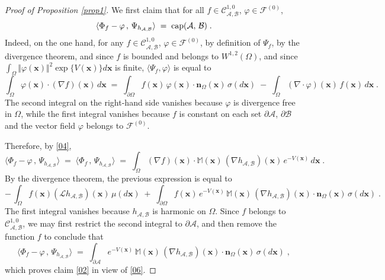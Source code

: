 \documentclass[reqno]{amsart}
\newcommand{\mc}[1]{{\mathcal #1}}
\newcommand{\bb}[1]{{\mathbb #1}}
\newcommand{\bs}[1]{{\boldsymbol #1}}
\newcommand{\<}{\langle}
\renewcommand{\>}{\rangle}
\renewcommand{\Cap}{{\rm cap}}
\begin{document}
\begin{proof}[Proof of Proposition \ref{prop1}]
We first claim that for all $f\in \mathcal C^{1,0}_{\mc A,\mc B}$, $\varphi
\in \mathcal F^{(0)}$,
\begin{equation}
\label{02}
\<\Phi_f - \varphi \,,\, \Psi_{h_{\mc A,\mc B}}\>  \;=\; \Cap (\mc A,\,\mc B) \;.
\end{equation}
Indeed, on the one hand, for any $f\in \mathcal C^{1,0}_{\mc A,\mc B}$, $\varphi
\in \mathcal F^{(0)}$, by definition of $\Psi_f$, by the divergence
theorem, and since $f$ is bounded and belongs to $ W^{1,2}(\Omega)$,
and since $\int_{\Omega} \Vert\varphi(\bs x)\Vert^2 \exp\{V(\bs{x})\} d\bs{x}$ is
finite, $\< \Psi_f , \varphi\>$ is equal to
\begin{equation*}
\int_{\Omega} \varphi(\bs{x}) \cdot (\nabla
f)(\bs{x}) \, d\bs{x} \;=\; \int_{\partial \Omega} f(\bs{x}) \, \varphi(\bs{x}) \cdot \bs
n_\Omega(\bs{x}) \, \sigma(d\bs{x})
\;-\; \int_{\Omega} (\nabla \cdot \varphi)(\bs{x}) \, f(\bs{x}) \, d\bs{x} \;.
\end{equation*}
The second integral on the right-hand side vanishes because $\varphi$
is divergence free in $\Omega$, while the first integral vanishes
because $f$ is constant on each set $\partial \mc A$, $\partial \mc B$ and the
vector field $\varphi$ belongs to $\mathcal F^{(0)}$.

Therefore, by \eqref{04},
\begin{equation*}
\<\Phi_f - \varphi \,,\, \Psi_{h_{\mc A,\mc B}}\>
\;=\; \<\Phi_f \,,\, \Psi_{h_{\mc A,\mc B}}\> \;=\;
\int_{\Omega} (\nabla f) (\bs{x}) \cdot \bb M(\bs{x}) \,
(\nabla h_{\mc A,\mc B})(\bs{x}) \, e^{-V(\bs{x})}\, d\bs{x} \;.
\end{equation*}
By the divergence theorem, the previous expression is equal to
\begin{equation*}
-\, \int_{\Omega} f (\bs{x}) (\mathcal L h_{\mc A,\mc B})(\bs{x}) \, \mu(d\bs{x})
\;+\; \int_{\partial \Omega} f (\bs{x}) \, e^{-V(\bs{x})}\, \bb M(\bs{x}) \,
(\nabla h_{\mc A,\mc B})(\bs{x}) \cdot \bs n_{\Omega}(\bs{x}) \, \sigma(d\bs{x})\;.
\end{equation*}
The first integral vanishes because $h_{\mc A,\mc B}$ is harmonic on
$\Omega$. Since $f$ belongs to $\mathcal C^{1,0}_{\mc A,\mc B}$, we may first
restrict the second integral to $\partial \mc A$, and then remove the
function $f$ to conclude that
\begin{equation*}
\<\Phi_f - \varphi \,,\, \Psi_{h_{\mc A,\mc B}}\>  \;=\;
\int_{\partial \mc A} e^{-V(\bs{x})}\, \bb M(\bs{x}) \,
(\nabla h_{\mc A,\mc B})(\bs{x}) \cdot \bs n_{\Omega}(\bs{x}) \, \sigma(d\bs{x})\;,
\end{equation*}
which proves claim \eqref{02} in view of \eqref{06}.


\end{proof}
\end{document}
